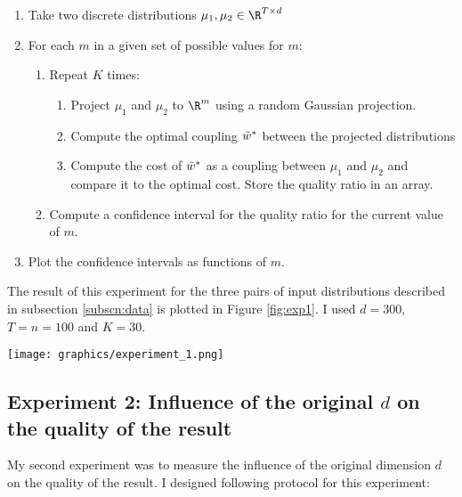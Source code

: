 \documentclass[11pt,a4paper]{article}
\begin{document}
\begin{enumerate}
    \item Take two discrete distributions $\mu_1, \mu_2 \in \R^{T \times d}$
    \item For each $m$ in a given set of possible values for $m$:
    \begin{enumerate}
        \item Repeat $K$ times:
        \begin{enumerate}
            \item Project $\mu_1$ and $\mu_2$ to $\R^m$ using a random Gaussian projection.
            \item Compute the optimal coupling $\Tilde{w}^*$ between the projected distributions 
            \item Compute the cost of $\Tilde{w}^*$ as a coupling between $\mu_1$ and $\mu_2$ and compare it to the optimal cost. Store the quality ratio in an array.
        \end{enumerate}
        \item Compute a confidence interval for the quality ratio for the current value of $m$.
    \end{enumerate}
    \item Plot the confidence intervals as functions of $m$.
\end{enumerate}

The result of this experiment for the three pairs of input distributions described in subsection \ref{subscn:data} is plotted in Figure \ref{fig:exp1}. I used $d=300$, $T=n=100$ and $K=30$.

\begin{figure*}
  \centering
  \texttt{[image: graphics/experiment\_1.png]}
  \caption{Influence of the projection dimension $m$ on the quality of the result}
  \label{fig:exp1}
\end{figure*}

\subsection{Experiment 2: Influence of the original $d$ on the quality of the result}

My second experiment was to measure the influence of the original dimension $d$ on the quality of the result. I designed following protocol for this experiment:
\end{document}
